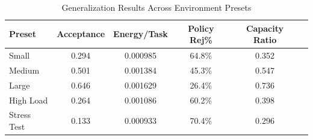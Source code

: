 \begin{table}[h]
\centering
\caption{Generalization Results Across Environment Presets}
\label{tab:generalization}
\begin{tabular}{lccccc}
\toprule
Preset & Acceptance & Energy/Task & Policy Rej\% & Capacity Ratio \\
\midrule
Small & 0.294 & 0.000985 & 64.8\% & 0.352 \\
Medium & 0.501 & 0.001384 & 45.3\% & 0.547 \\
Large & 0.646 & 0.001629 & 26.4\% & 0.736 \\
High Load & 0.264 & 0.001086 & 60.2\% & 0.398 \\
Stress Test & 0.133 & 0.000933 & 70.4\% & 0.296 \\
\bottomrule
\end{tabular}
\end{table}
